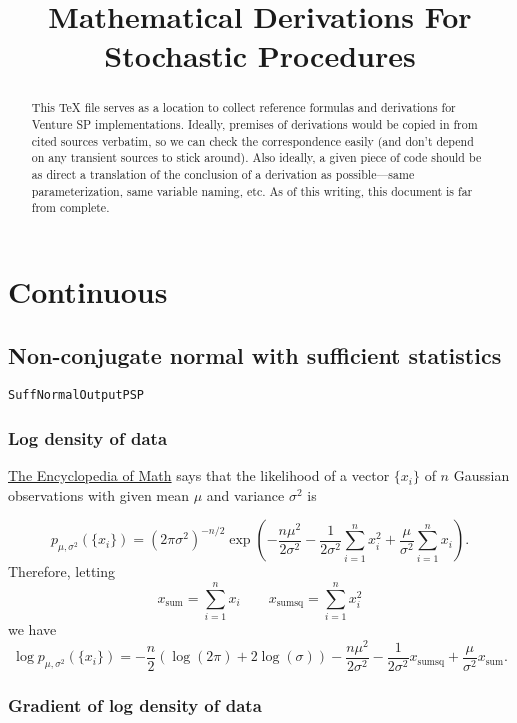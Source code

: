 \documentclass[12pt]{article}
\title{Mathematical Derivations For Stochastic Procedures}
\begin{document}
\maketitle

\begin{abstract}
This TeX file serves as a location to collect reference formulas and
derivations for Venture SP implementations.  Ideally, premises of
derivations would be copied in from cited sources verbatim, so we can
check the correspondence easily (and don't depend on any transient
sources to stick around).  Also ideally, a given piece of code should
be as direct a translation of the conclusion of a derivation as
possible---same parameterization, same variable naming, etc.  As of
this writing, this document is far from complete.
\end{abstract}

\section{Continuous}

\subsection{Non-conjugate normal with sufficient statistics}
\texttt{SuffNormalOutputPSP}

\subsubsection{Log density of data}
\href{http://www.encyclopediaofmath.org/index.php/Sufficient_statistic}
{The Encyclopedia of Math}
says that the likelihood of a vector $\{x_i\}$ of $n$ Gaussian
observations with given mean $\mu$ and variance $\sigma^2$ is

\[ p_{\mu,\sigma^2}(\{x_i\}) = (2\pi\sigma^2)^{-n/2} \exp\left( -\frac{n \mu^2}{2 \sigma^2}
   - \frac{1}{2 \sigma^2} \sum_{i=1}^n x_i^2 + \frac{\mu}{\sigma^2}\sum_{i=1}^nx_i\right). \]
\newcommand{\xsum}{x_{\textrm{sum}}}
\newcommand{\xsumsq}{x_{\textrm{sumsq}}}
Therefore, letting
\[ \xsum = \sum_{i=1}^nx_i \qquad \xsumsq = \sum_{i=1}^n x_i^2 \]
we have
\[ \log p_{\mu,\sigma^2}(\{x_i\}) = -\frac{n}{2}(\log(2\pi) + 2\log(\sigma))
   -\frac{n \mu^2}{2 \sigma^2}
   - \frac{1}{2 \sigma^2} \xsumsq + \frac{\mu}{\sigma^2}\xsum. \]

\subsubsection{Gradient of log density of data}
\end{document}

